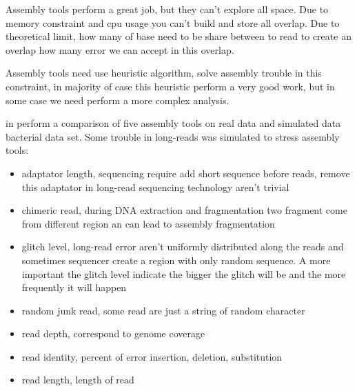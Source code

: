 \documentclass[./main.tex]{subfiles}
\begin{document}
Assembly tools perform a great job, but they can't explore all space.
Due to memory constraint and cpu usage you can't build and store all overlap.
Due to theoretical limit, how many of base need to be share between to read to create an overlap how many error we can accept in this overlap.

Assembly tools need use heuristic algorithm, solve assembly trouble in this constraint, in majority of case this heuristic perform a very good work, but in some case we need perform a more complex analysis.

\citeauthor{long_read_assembler_comparison} in \cite{long_read_assembler_comparison} perform a comparison of five assembly tools on real data and simulated data bacterial data set. Some trouble in long-reads was simulated to stress assembly tools:
\begin{itemize}
    \item adaptator length, sequencing require add short sequence before reads, remove this adaptator in long-read sequencing technology aren't trivial
    \item chimeric read, during DNA extraction and fragmentation two fragment come from different region an can lead to assembly fragmentation
    \item glitch level, long-read error aren't uniformly distributed along the reads and sometimes sequencer create a region with only random sequence. A more important the glitch level indicate the bigger the glitch will be and the more frequently it will happen
    \item random junk read, some read are just a string of random character
    \item read depth, correspond to genome coverage
    \item read identity, percent of error insertion, deletion, substitution 
    \item read length, length of read 
\end{itemize}
\end{document}
